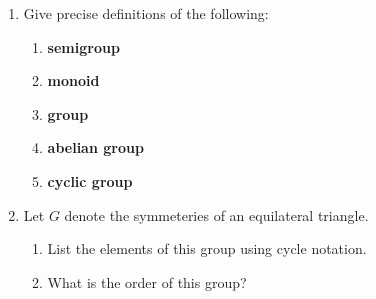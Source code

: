\documentclass[fleqn,12pt]{article}
\newcommand{\<}{\ensuremath{\langle}}
\renewcommand{\>}{\ensuremath{\rangle}}
\begin{document}
\begin{enumerate}[{\bf 1.}]
\item Give precise definitions of the following:

  \begin{enumerate}


  \item {\bf semigroup}

    \vskip4cm

  \item {\bf monoid}

    \vskip4cm

  \item {\bf group}

    \vskip4.5cm

  \item {\bf abelian group}

    \vskip3.5cm

  \item {\bf cyclic group}
    
  \end{enumerate}

\newpage

\item Let $G$ denote the symmeteries of an equilateral triangle.

\begin{center}
\end{center}


  \begin{enumerate}
\item List the elements of this group using cycle notation.
\vskip7cm

\item What is the order of this group?
\vskip3cm


\end{enumerate}
\end{enumerate}
\end{document}
